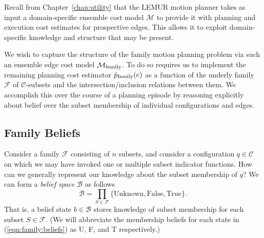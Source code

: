 Recall from Chapter~\ref{chap:utility}
that the LEMUR motion planner takes as input
a domain-specific ensemble cost model
$\mathcal{M}$ to provide it with planning and execution cost
estimates for prospective edges.
This allows it to exploit domain-specific
knowledge and structure that may be present.

We wish to capture the structure of the family motion planning problem
via such an ensemble edge cost model $\mathcal{M}_{\mbox{\scriptsize family}}$.
To do so requires us to implement the remaining planning cost estimator
$\grave{p}_{\mbox{\scriptsize family}}(e)$
as a function of the underly family
$\mathcal{F}$ of $\mathcal{C}$-subsets
and the intersection/inclusion relations between them.
We accomplish this over the course of a planning episode
by reasoning explicitly about belief over the subset membership
of individual configurations and edges.


\subsection{Family Beliefs}

Consider a family $\mathcal{F}$ consisting of $n$ subsets,
and consider a configuration $q \in \mathcal{C}$ on which
we may have invoked one or multiple subset indicator functions.
How can we generally represent our knowledge
about the subset membership of $q$?
We can form a \emph{belief space} $\mathcal{B}$ as follows
\begin{equation}
   \mathcal{B} = \prod_{S \in \mathcal{F}}
      \{ \mbox{Unknown}, \mbox{False}, \mbox{True} \}.
   \label{eqn:family:beliefs}
\end{equation}
That is,
a belief state $b \in \mathcal{B}$ stores
knowledge of subset membership for each subset $S \in \mathcal{F}$.
(We will abbreviate the membership beliefs for each state
in (\ref{eqn:family:beliefs})
as U, F, and T respectively.)

